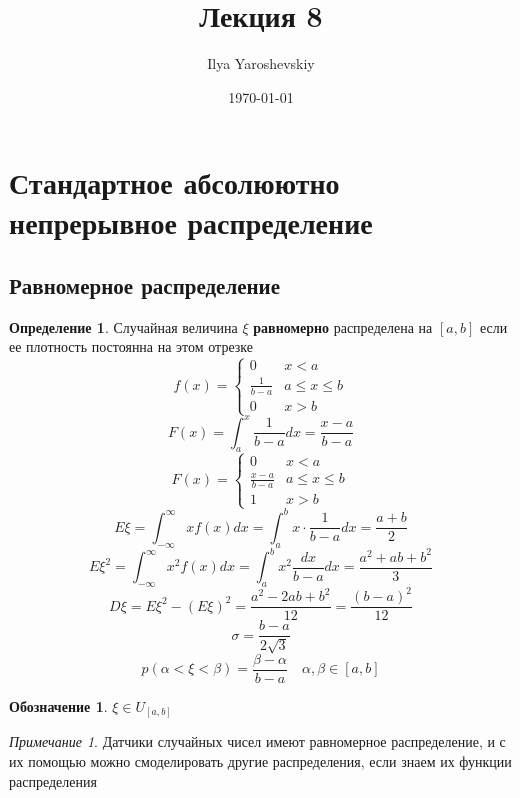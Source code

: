 \documentclass[english]{article}
\author{Ilya Yaroshevskiy}
\date{\today}
\title{Лекция 8}
\theoremstyle{plain}
\theoremstyle{remark}
\newtheorem*{remark}{Примечание}
\theoremstyle{definition}
\newtheorem*{definition}{Определение}
\newtheorem*{symb}{Обозначение}
\begin{document}
\maketitle
\tableofcontents


\section{Стандартное абсолюютно непрерывное распределение}
\label{sec:org83c0a15}
\subsection{Равномерное распределение}
\label{sec:org9b54868}
\begin{definition}
Случайная величина \(\xi\) \textbf{равномерно} распределена на \([a, b]\) если ее плотность постоянна на этом отрезке
\[ f(x) = \begin{cases}
0 & x < a \\
\frac{1}{b - a} & a \le x \le b \\
0 & x > b
\end{cases}\]
\[ F(x) = \int_a^x \frac{1}{b - a}dx = \frac{x - a}{b - a} \]
\[ F(x) = \begin{cases}
0 & x < a \\
\frac{x - a}{b - a} & a \le x \le b \\
1 & x > b
\end{cases} \]
\[ E\xi = \int_{-\infty}^\infty x f(x) dx = \int_a^b x \cdot \frac{1}{b - a} dx = \frac{a + b}{2} \]
\[ E\xi^2 = \int_{-\infty}^\infty x^2f(x) dx = \int_a^b x^2 \frac{dx}{b - a}dx = \frac{a^2 + ab + b^2}{3} \]
\[ D\xi = E\xi^2 - (E\xi)^2 = \frac{a^2 - 2ab + b^2}{12} = \frac{(b - a)^2}{12} \]
\[ \sigma = \frac{b - a}{2\sqrt{3}} \]
\[ p(\alpha < \xi < \beta) = \frac{\beta - \alpha}{b - a} \quad \alpha, \beta \in [a, b] \]
\end{definition}
\begin{symb}
\(\xi \in U_{[a, b]}\)
\end{symb}
\begin{remark}
Датчики случайных чисел имеют равномерное распределение, и с их помощью можно смоделировать другие распределения, если знаем их функции распределения
\end{remark}
\end{document}
